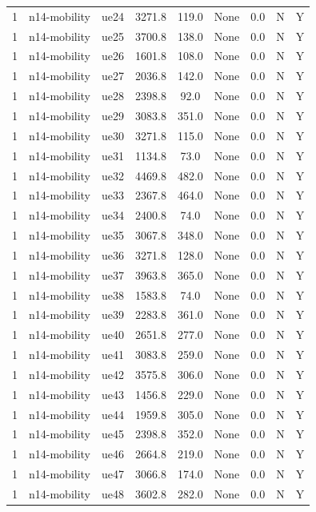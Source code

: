 \begin{table}[ht]
\begin{tabular}{|c|c|c|c|c|c|c|c|c|}
1 & n14-mobility & ue24 & 3271.8 & 119.0 & None & 0.0 & N & Y \\
1 & n14-mobility & ue25 & 3700.8 & 138.0 & None & 0.0 & N & Y \\
1 & n14-mobility & ue26 & 1601.8 & 108.0 & None & 0.0 & N & Y \\
1 & n14-mobility & ue27 & 2036.8 & 142.0 & None & 0.0 & N & Y \\
1 & n14-mobility & ue28 & 2398.8 & 92.0 & None & 0.0 & N & Y \\
1 & n14-mobility & ue29 & 3083.8 & 351.0 & None & 0.0 & N & Y \\
1 & n14-mobility & ue30 & 3271.8 & 115.0 & None & 0.0 & N & Y \\
1 & n14-mobility & ue31 & 1134.8 & 73.0 & None & 0.0 & N & Y \\
1 & n14-mobility & ue32 & 4469.8 & 482.0 & None & 0.0 & N & Y \\
1 & n14-mobility & ue33 & 2367.8 & 464.0 & None & 0.0 & N & Y \\
1 & n14-mobility & ue34 & 2400.8 & 74.0 & None & 0.0 & N & Y \\
1 & n14-mobility & ue35 & 3067.8 & 348.0 & None & 0.0 & N & Y \\
1 & n14-mobility & ue36 & 3271.8 & 128.0 & None & 0.0 & N & Y \\
1 & n14-mobility & ue37 & 3963.8 & 365.0 & None & 0.0 & N & Y \\
1 & n14-mobility & ue38 & 1583.8 & 74.0 & None & 0.0 & N & Y \\
1 & n14-mobility & ue39 & 2283.8 & 361.0 & None & 0.0 & N & Y \\
1 & n14-mobility & ue40 & 2651.8 & 277.0 & None & 0.0 & N & Y \\
1 & n14-mobility & ue41 & 3083.8 & 259.0 & None & 0.0 & N & Y \\
1 & n14-mobility & ue42 & 3575.8 & 306.0 & None & 0.0 & N & Y \\
1 & n14-mobility & ue43 & 1456.8 & 229.0 & None & 0.0 & N & Y \\
1 & n14-mobility & ue44 & 1959.8 & 305.0 & None & 0.0 & N & Y \\
1 & n14-mobility & ue45 & 2398.8 & 352.0 & None & 0.0 & N & Y \\
1 & n14-mobility & ue46 & 2664.8 & 219.0 & None & 0.0 & N & Y \\
1 & n14-mobility & ue47 & 3066.8 & 174.0 & None & 0.0 & N & Y \\
1 & n14-mobility & ue48 & 3602.8 & 282.0 & None & 0.0 & N & Y \\

\end{tabular}
\end{table}
